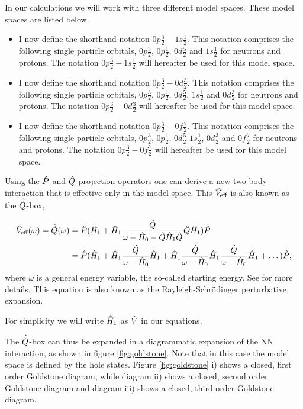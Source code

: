 In our calculations we will work with three different model spaces. These model spaces are listed
below.
\begin{itemize}

\item I now define the shorthand notation $0p\frac32-1s\frac12$. This notation
comprises the following single particle orbitals, $0p\frac32$, $0p\frac12$,
$0d\frac52$ and $1s\frac12$ for neutrons and protons. The notation
$0p\frac32-1s\frac12$ will hereafter be used for this model space.

\item I now define the shorthand notation $0p\frac32-0d\frac32$. This notation
comprises the following single particle orbitals, $0p\frac32$, $0p\frac12$,
$0d\frac52$, $1s\frac12$ and $0d\frac32$ for neutrons and protons. The notation
$0p\frac32-0d\frac32$ will hereafter be used for this model space.

\item I now define the shorthand notation $0p\frac32-0f\frac72$. This notation
comprises the following single particle orbitals, $0p\frac32$, $0p\frac12$,
$0d\frac52$ $1s\frac12$, $0d\frac32$ and $0f\frac72$ for neutrons and protons.
The notation $0p\frac32-0f\frac72$ will hereafter be used for this model space.

\end{itemize}

Using the $\hat{P}$ and $\hat{Q}$ projection operators one can derive a new two-body
interaction that is effective only in the model space. This $\hat{V}_{\textrm{eff}}$ is also known
as the $\hat{\tilde{Q}}$-box,

\begin{align}
	\ve(\omega) = \qq(\omega) &= \p(\h_1 + \h_1\frac{\q}{\omega-\h_0-\q\h_1\q}\q\h_1)\p\\
	&= \p(\h_1 + \h_1\frac{\q}{\omega-\h_0}\h_1 + \h_1\frac{\q}{\omega-\h_0}\h_1\frac{\q}{\omega-\h_0}\h_1 + \dots)\p,
	\label{eq:Qbox}
\end{align}
where $\omega$ is a general energy variable, the so-called starting energy. See
\citep{kuo} for more details. This equation is also known as the
Rayleigh-Schr\"{o}dinger perturbative expansion.

For simplicity we will write $\hat{H}_1$ as $\hat{V}$ in our equations.

The $\hat{\tilde{Q}}$-box can thus be expanded in a diagrammatic expansion of the NN
interaction, as shown in figure \ref{fig:goldstone}. Note that in this case the
model space is defined by the hole states. Figure \ref{fig:goldstone} i) shows
a closed, first order Goldstone diagram, while diagram ii) shows a closed,
second order Goldstone diagram and diagram iii) shows a closed, third order
Goldstone diagram.

